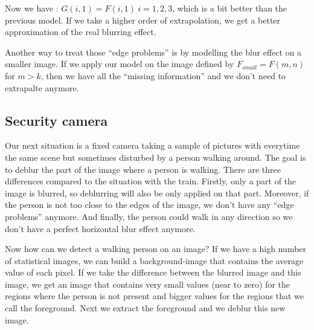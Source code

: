 Now we have : $G(i,1) = F(i,1)~i=1,2,3$, which is a bit better than the previous model. If we take a higher order of extrapolation, we get a better approximation of the real blurring effect.


Another way to treat those ``edge problems'' is by modelling the blur effect on a smaller image. If we apply our model on the image defined by $F_{small} = F(m,n)$ for $m>k$, then we have all the ``missing information'' and we don't need to extrapalte anymore.


\subsection{Security camera}

Our next situation is a fixed camera taking a sample of pictures with everytime the same scene but sometimes disturbed by a person walking around. The goal is to deblur the part of the image where a person is walking. There are three differences compared to the situation with the train. Firstly, only a part of the image is blurred, so deblurring will also be only applied on that part. Moreover, if the person is not too close to the edges of the image, we don't have any ``edge problems'' anymore. And finally, the person could walk in any direction so we don't have a perfect horizontal blur effect anymore.

Now how can we detect a walking person on an image? If we have a high number of statistical images, we can build a background-image that contains the average value of each pixel. If we take the difference between the blurred image and this image, we get an image that contains very small values (near to zero) for the regions where the person is not present and bigger values for the regions that we call the foreground. Next we extract the foreground and we deblur this new image.
